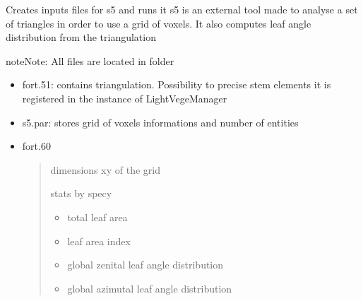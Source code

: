 \documentclass[letterpaper,10pt,english]{sphinxmanual}
\begin{document}
\begin{fulllineitems}
\begin{fulllineitems}
\end{fulllineitems}


\begin{fulllineitems}
\label{\detokenize{reference:LVM.LightVegeManager.s5}}
\pysigstartsignatures
{}
\pysigstopsignatures
\sphinxAtStartPar
Creates inputs files for s5 and runs it
s5 is an external tool made to analyse a set of triangles in order to use a grid of voxels.
It also computes leaf angle distribution from the triangulation

\begin{sphinxadmonition}{note}{Note:}
\sphinxAtStartPar
All files are located in  folder
\end{sphinxadmonition}

\sphinxAtStartPar
{}
\begin{itemize}
\item {} 
\sphinxAtStartPar
fort.51: contains triangulation. Possibility to precise stem elements it is registered in the instance of LightVegeManager

\item {} 
\sphinxAtStartPar
s5.par: stores grid of voxels informations and number of entities

\end{itemize}

\sphinxAtStartPar
{}
\begin{itemize}
\item {} 
\sphinxAtStartPar
fort.60
\begin{quote}

\sphinxAtStartPar
dimensions xy of the grid

\sphinxAtStartPar
stats by specy
\begin{itemize}
\item {} 
\sphinxAtStartPar
total leaf area

\item {} 
\sphinxAtStartPar
leaf area index

\item {} 
\sphinxAtStartPar
global zenital leaf angle distribution

\item {} 
\sphinxAtStartPar
global azimutal leaf angle distribution


\end{itemize}
\end{quote}
\end{itemize}
\end{fulllineitems}
\end{fulllineitems}
\end{document}

